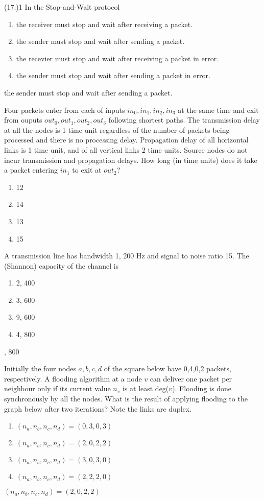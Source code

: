 \documentclass[a4 paper]{article}
\begin{document}
\problem(17:){1}
In the Stop-and-Wait protocol
\begin{enumerate}
	\item the receiver must stop and wait after receiving a packet.
	\item the sender must stop and wait after sending a packet.
	\item the recevier must stop and  wait after receiving a packet in error.
	\item the sender must stop and wait after sending a packet in error.
\end{enumerate}
\solution the sender must stop and wait after sending a packet.

Four packets enter from each of inputs $in_{0},in_{1},in_{2},in_{3}$ at the same time and exit from ouputs $out_{0},out_{1},out_{2},out_{3}$ following shortest paths. The transmission delay at all the nodes is 1 time unit regardless of the number of packets being processed and there is no processing delay. Propagation delay of all horizontal links is 1 time unit, and of all vertical links 2 time units. Source nodes do not incur transmission and propagation delays. How long (in time units) does it take a packet entering $in_{1}$ to exit at $out_2$?
\begin{enumerate}
	\item 12
	\item 14
	\item 13
	\item 15
\end{enumerate}

A transmission line has bandwidth 1, 200 Hz and signal to noise ratio 15.
The (Shannon) capacity of the channel is
\begin{enumerate}
	\item 2, 400
	\item 3, 600
	\item 9, 600
	\item 4, 800
\end{enumerate}
, 800

Initially the four nodes $a,b,c,d$ of the square below have 0,4,0,2 packets, respectively. A flooding algorithm at a node $v$ can deliver one packet per neighbour only if its current value $n_v$ is at least deg($v$). Flooding is done synchronously by all the nodes. What is the result of applying flooding to the graph below after two iterations? Note the links are duplex.
\begin{enumerate}
	\item $(n_a,n_b,n_c,n_d)=(0,3,0,3)$
	\item $(n_a,n_b,n_c,n_d)=(2,0,2,2)$
	\item $(n_a,n_b,n_c,n_d)=(3,0,3,0)$
	\item $(n_a,n_b,n_c,n_d)=(2,2,2,0)$
\end{enumerate}
\solution $(n_a,n_b,n_c,n_d)=(2,0,2,2)$
\end{document}
